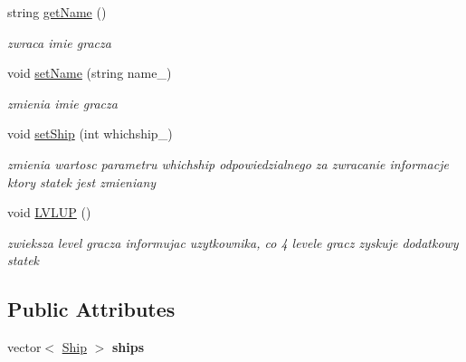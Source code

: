 \begin{DoxyCompactItemize}
string \hyperlink{class_player_af9a6045fa96f736664c4eab4caa5e8e5}{get\+Name} ()
\begin{DoxyCompactList}\small\item\em zwraca imie gracza \end{DoxyCompactList}\item 
\mbox{\label{class_player_a39ac9846fd6c4e10721aa1e27aa0fefc}} 
void \hyperlink{class_player_a39ac9846fd6c4e10721aa1e27aa0fefc}{set\+Name} (string name\+\_\+)
\begin{DoxyCompactList}\small\item\em zmienia imie gracza \end{DoxyCompactList}\item 
\mbox{\label{class_player_a6741206aebacced45148788c7f847631}} 
void \hyperlink{class_player_a6741206aebacced45148788c7f847631}{set\+Ship} (int whichship\+\_\+)
\begin{DoxyCompactList}\small\item\em zmienia wartosc parametru whichship odpowiedzialnego za zwracanie informacje ktory statek jest zmieniany \end{DoxyCompactList}\item 
\mbox{\label{class_player_af9c0820574406f3d4db31bf006aa368d}} 
void \hyperlink{class_player_af9c0820574406f3d4db31bf006aa368d}{L\+V\+L\+UP} ()
\begin{DoxyCompactList}\small\item\em zwieksza level gracza informujac uzytkownika, co 4 levele gracz zyskuje dodatkowy statek \end{DoxyCompactList}\end{DoxyCompactItemize}
\subsection*{Public Attributes}
\begin{DoxyCompactItemize}
\item 
\mbox{\label{class_player_ab6c034dcfbb08a9346be1cff7a607cfa}} 
vector$<$ \hyperlink{class_ship}{Ship} $>$ {\bfseries ships}
\end{DoxyCompactItemize}
